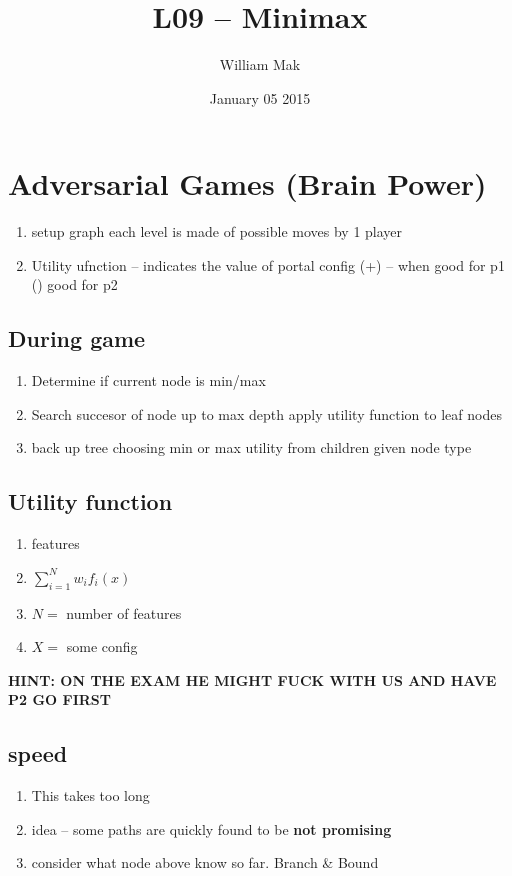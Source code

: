 \documentclass{article}
\title{L09 -- Minimax}
\author{William Mak}
\date{January 05 2015}
\begin{document}
\maketitle
\section{Adversarial Games (Brain Power)}
\begin{enumerate}
	\item setup graph each level is made of possible moves by 1 player
	\item Utility ufnction -- indicates the value of portal config
		\subitem (+) -- when good for p1 (\-) good for p2
\end{enumerate}
\subsection{During game}
\begin{enumerate}
	\item Determine if current node is min/max
	\item Search succesor of node up to max depth
		\subitem apply utility function to leaf nodes
	\item back up tree choosing min or max utility from children given node type
\end{enumerate}

\subsection{Utility function}
\begin{enumerate}
	\item  features
	\item $\sum_{i=1}^{N} w_i f_i(x)$
	\item $N =$ number of features
	\item $X =$ some config
\end{enumerate}
\textbf{HINT: ON THE EXAM HE MIGHT FUCK WITH US AND HAVE P2 GO FIRST}

\subsection{speed}
\begin{enumerate}
	\item This takes too long
	\item idea -- some paths are quickly found to be \textbf{not promising}
	\item consider what node above know so far.
		\subitem Branch \& Bound
\end{enumerate}
\end{document}
